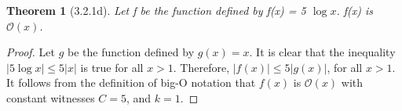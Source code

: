 \documentclass[a4paper, 12pt]{article}
\theoremstyle{plain}
\newtheorem*{theorem*}{Theorem}
\begin{document}
	
	\begin{theorem*}[3.2.1d]
		Let f be the function defined by f(x) = 5 $\log x$. \newline f(x) is $\mathcal{O} (x)$.
	\end{theorem*}
	
	\begin{proof}
		Let $g$ be the function defined by $g(x) = x$. It is clear that the inequality $|5 \log x| \le 5|x|$ is true for all $x > 1$. Therefore, $|f(x)| \le 5|g(x)|$, for all $x > 1$. It follows from the definition of big-O notation that $f(x)$ is $\mathcal{O} (x)$ with constant witnesses $C = 5$, and $k = 1$.
	\end{proof}
\end{document}
